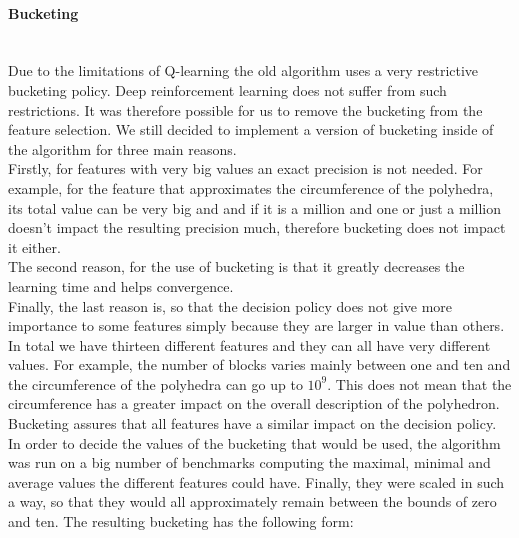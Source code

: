 \paragraph{Bucketing}\mbox{}\\
Due to the limitations of Q-learning the old algorithm uses a very restrictive bucketing policy. Deep reinforcement learning does not suffer from such restrictions. It was therefore possible for us to remove the bucketing from the feature selection. We still decided to implement a version of bucketing inside of the algorithm for three main reasons. \\
Firstly, for features with very big values an exact precision is not needed. For example, for the feature that approximates the circumference of the polyhedra, its total value can be very big and and if it is a million and one or just a million doesn't impact the resulting precision much, therefore bucketing does not impact it either. \\
The second reason, for the use of bucketing is that it greatly decreases the learning time and helps convergence. \\
Finally, the last reason is, so that the decision policy does not give more importance to some features simply because they are larger in value than others. In total we have thirteen different features and they can all have very different values. For example, the number of blocks varies mainly between one and ten and the circumference of the polyhedra can go up to $10^9$. This does not mean that the circumference has a greater impact on the overall description of the polyhedron. Bucketing assures that all features have a similar impact on the decision policy.\\
In order to decide the values of the bucketing that would be used,  the algorithm was run on a big number of benchmarks computing the maximal, minimal and average values the different features could have. Finally, they were scaled in such a way, so that they would all approximately remain between the bounds of zero and ten. The resulting bucketing has the following form:
